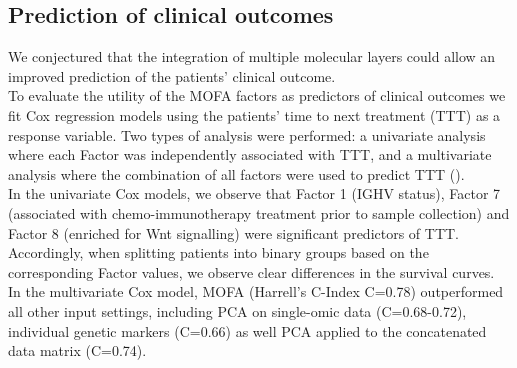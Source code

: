 \subsection{Prediction of clinical outcomes}

We conjectured that the integration of multiple molecular layers could allow an improved prediction of the patients' clinical outcome.\\
To evaluate the utility of the MOFA factors as predictors of clinical outcomes we fit Cox regression models \cite{Cox1972} using the patients' time to next treatment (TTT) as a response variable. Two types of analysis were performed: a univariate analysis where each Factor was independently associated with TTT, and a multivariate analysis where the combination of all factors were used to predict TTT ().\\
In the univariate Cox models, we observe  that Factor 1 (IGHV status), Factor 7 (associated with chemo-immunotherapy treatment prior to sample collection) and Factor 8 (enriched for Wnt signalling) were significant predictors of TTT. Accordingly, when splitting patients into binary groups based on the corresponding Factor values, we observe clear differences in the survival curves.\\
In the multivariate Cox model, MOFA (Harrell's C-Index C=0.78) outperformed all other input settings, including PCA on single-omic data (C=0.68-0.72), individual genetic markers (C=0.66) as well PCA applied to the concatenated data matrix (C=0.74).


